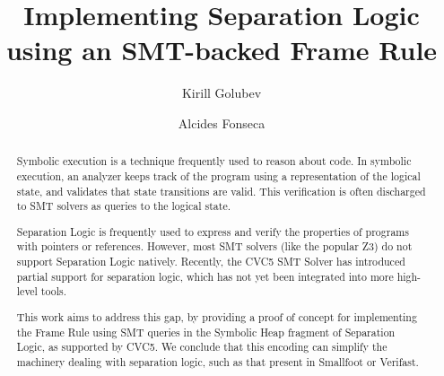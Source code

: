 \documentclass[sigplan,screen,review]{acmart}
\begin{document}
\title[Implementing Separation Logic using an SMT-backed Frame Rule]{Implementing Separation Logic \\ using an SMT-backed Frame Rule}

\author{Kirill Golubev}

\author{Alcides Fonseca}

\begin{abstract}

Symbolic execution is a technique frequently used to reason about code. In symbolic execution, an analyzer keeps track of the program using a representation of the logical state, and validates that state transitions are valid. This verification is often discharged to SMT solvers as queries to the logical state.

Separation Logic is frequently used to express and verify the properties of programs with pointers or references. However, most SMT solvers (like the popular Z3) do not support Separation Logic natively. Recently, the CVC5 SMT Solver has introduced partial support for separation logic, which has not yet been integrated into more high-level tools.

This work aims to address this gap, by providing a proof of concept for implementing the Frame Rule using SMT queries in the Symbolic Heap fragment of Separation Logic, as supported by CVC5. We conclude that this encoding can simplify the machinery dealing with separation logic, such as that present in Smallfoot or Verifast.

\end{abstract}
\end{document}
